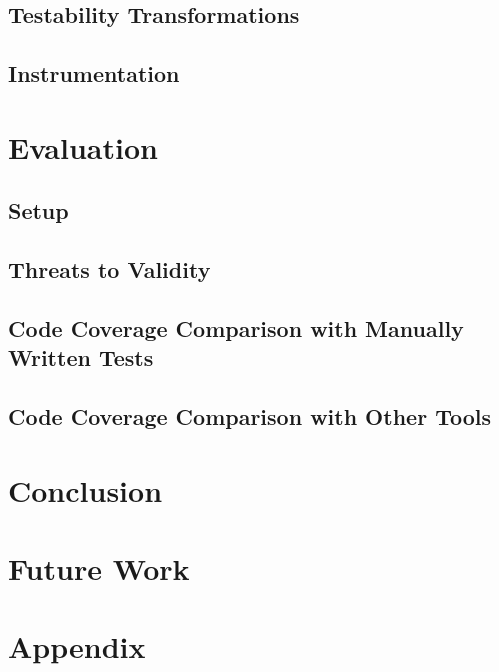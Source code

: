 \documentclass{article}
\begin{document}
\subsection{Testability Transformations}
\subsection{Instrumentation}


\section{Evaluation}
\subsection{Setup}
\subsection{Threats to Validity}
\subsection{Code Coverage Comparison with Manually Written Tests}
\subsection{Code Coverage Comparison with Other Tools}


\section{Conclusion}

\section{Future Work}

\section{Appendix}










\end{document}
